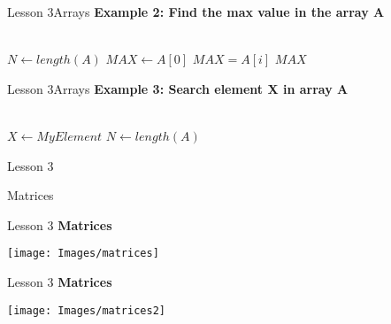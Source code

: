 \documentclass[aspectratio=1610]{beamer}
\begin{document}
\begin{frame}{Lesson 3}{Arrays}
\Large
\textbf{Example 2: Find the max value in the array A}\\~\\


\label{MaxArray}
\begin{algorithmic}[1]
 
\State $N\gets length(A)$
\State $MAX\gets A[0]$
    \State \textbf{$MAX = A[i]$} 
\EndIf
\EndFor
\State \Return $MAX$
\EndProcedure
\end{algorithmic}
\end{frame}



\begin{frame}{Lesson 3}{Arrays}
\Large
\textbf{Example 3: Search element X in array A}\\~\\
\label{SearchArray}
\begin{algorithmic}[1]
 
\State $X\gets MyElement$
\State $N\gets length(A)$
    \State {}  
\EndIf
\EndFor
\State {} 
\EndProcedure
\end{algorithmic}
\end{frame}


\begin{frame}{Lesson 3}{}
\begin{center}
\Huge Matrices
\end{center}
\end{frame}


\begin{frame}{Lesson 3}{}
\LARGE
\textbf{Matrices}
\begin{center}
\texttt{[image: Images/matrices]}
\end{center}
\end{frame}


\begin{frame}{Lesson 3}{}
\LARGE
\textbf{Matrices}
\begin{center}
\texttt{[image: Images/matrices2]}
\end{center}
\end{frame}
\end{document}
